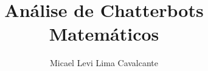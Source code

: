 \usepackage{sbc-template}
\usepackage{graphicx,url}
\usepackage[brazil]{babel}   
\usepackage[utf8]{inputenc}  

\usepackage{verbatim}
\usepackage{color}
\usepackage[table,xcdraw]{xcolor}
\usepackage{multirow}
\usepackage{enumitem}

\newcommand{\toprule}{\hline}
\newcommand{\midrule}{\hline}
\newcommand{\bottomrule}{\hline}

\makeatletter
\renewenvironment{thebibliography}[1]
     {\section{\bibname}%
      \@mkboth{\MakeUppercase\bibname}{\MakeUppercase\bibname}%
      \list{\@biblabel{\@arabic\c@enumiv}}%
           {\settowidth\labelwidth{\@biblabel{#1}}%
            \leftmargin\labelwidth
            \advance\leftmargin\labelsep
            \@openbib@code
            \usecounter{enumiv}%
            \let\p@enumiv\@empty
            \renewcommand\theenumiv{\@arabic\c@enumiv}}%
      \sloppy
      \clubpenalty4000
      \@clubpenalty \clubpenalty
      \widowpenalty4000%
      \sfcode`\.\@m}
     {\def\@noitemerr
       {\@latex@warning{Empty `thebibliography' environment}}%
      \endlist}
\makeatother

     
\sloppy

\title{Análise de Chatterbots Matemáticos}

\author{Micael Levi Lima Cavalcante}


\address{Instituto de Computação -- Universidade Federal do Amazonas (UFAM)\\
  69.007-000 -- Manaus -- AM -- Brasil
}


\newcommand{\eu}[1]{\textcolor{githubpurple}{[eu]}\texttt{ #1}}
\newcommand{\chatbot}[1]{\textcolor{githubblue}{[bot]}\texttt{ #1}}

